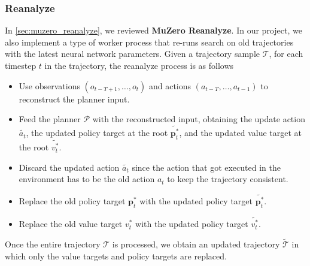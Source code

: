 \subsubsection{Reanalyze} \label{sec:reanalyze}
In \ref{sec:muzero_reanalyze}, we reviewed \textbf{MuZero Reanalyze}.
In our project, we also implement a type of worker process that re-runs search on old trajectories with the latest neural network parameters.
Given a trajectory sample $\mathcal{T}$, for each timestep $t$ in the trajectory, the reanalyze process is as follows
\begin{itemize}
    \item Use observations $(o_{t - T + 1}, \dots, o_{t})$ and actions $(a_{t - T}, \dots, a_{t - 1})$ to reconstruct the planner input.
    \item Feed the planner $\mathcal{P}$ with the reconstructed input, obtaining the update action $\tilde{a_t}$, the updated policy target at the root $\tilde{\mathbf{p}^*_t}$, and the updated value target at the root $\tilde{v^*_t}$.
    \item Discard the updated action $\tilde{a_t}$ since the action that got executed in the environment has to be the old action $a_t$ to keep the trajectory consistent.
    \item Replace the old policy target $\mathbf{p}^*_t$ with the updated policy target $\tilde{\mathbf{p}^*_t}$.
    \item Replace the old value target $v^*_t$ with the updated policy target $\tilde{v^*_t}$.
\end{itemize}
Once the entire trajectory $\mathcal{T}$ is processed, we obtain an updated trajectory $\tilde{\mathcal{T}}$ in which only the value targets and policy targets are replaced.


